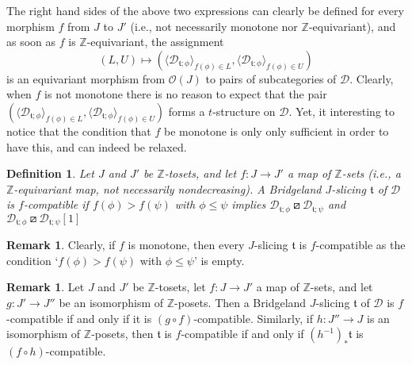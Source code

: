 \documentclass{article}
\newtheorem{defn}[thm]{Definition}
\theoremstyle{definition}
\newtheorem{rem}[thm]{Remark}
\newcommand{\Z}{\mathbb{Z}}
\newcommand{\tee}{\mathfrak{t}}
\newcommand{\orth}{\boxslash}
\begin{document}
The right hand sides of the above two expressions can clearly be defined for every morphism $f$ from $J$ to $J'$ (i.e., not necessarily monotone nor $\Z$-equivariant), and as soon as $f$ is $\Z$-equivariant, the assignment
\[
(L,U)\mapsto (\langle \mathscr{D}_{\tee;\phi}\rangle_{f(\phi)\in L},\langle \mathscr{D}_{\tee;\phi}\rangle_{f(\phi)\in U})
\]
is an equivariant morphism from $\mathcal{O}(J)$ to pairs of subcategories of $\mathscr{D}$. Clearly, when $f$ is not monotone there is no reason to expect that the pair $(\langle \mathscr{D}_{\tee;\phi}\rangle_{f(\phi)\in L},\langle \mathscr{D}_{\tee;\phi}\rangle_{f(\phi)\in U})$ forms a $t$-structure on $\mathscr{D}$. Yet, it interesting to notice that the condition that $f$ be monotone is only only sufficient in order to have this, and can indeed be relaxed.

\begin{defn}\label{compatible}
Let $J$ and $J'$ be $\Z$-tosets, and let $f\colon J\to J'$ a map of $\Z$-sets (i.e., a $\Z$-equivariant map, not necessarily nondecreasing). A Bridgeland $J$-slicing $\tee$ of $\mathscr{D}$ is \emph{$f$-compatible}
if $f(\phi)>f(\psi)$ with $\phi\leq \psi$ implies $\mathscr{D}_{\tee; \phi}\orth \mathscr{D}_{\tee;\psi}$ and $\mathscr{D}_{\tee; \phi}\orth \mathscr{D}_{\tee;\psi}[1]$
\end{defn}

\begin{rem}\label{everything-compatible}
Clearly, if $f$ is monotone, then every $J$-slicing $\tee$ is $f$-compatible as the condition `$f(\phi)>f(\psi)$ with $\phi\leq \psi$' is empty.
\end{rem}

\begin{rem}\label{avanti-e-indietro}
Let $J$ and $J'$ be $\Z$-tosets, let $f\colon J\to J'$ a map of $\Z$-sets, and let $g\colon J'\to J''$ be an isomorphism of $\Z$-posets. Then a Bridgeland $J$-slicing $\tee$ of $\mathscr{D}$ is $f$-compatible if and only if it is $(g\circ f)$-compatible. Similarly, if $h\colon J''\to J$ is an isomorphism of $\Z$-posets, then $\tee$ is $f$-compatible if and only if $(h^{-1})_*\tee$ is $(f\circ h)$-compatible.
\end{rem}
\end{document}
